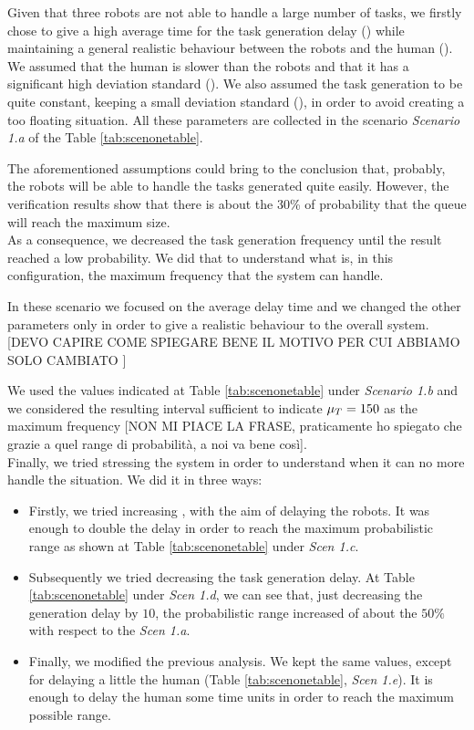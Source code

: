 Given that three robots are not able to handle a large number of tasks, we firstly chose to give a high average time for the task generation delay (\mT) while maintaining a general realistic behaviour between the robots and the human (\mH). We assumed that the human is slower than the robots and that it has a significant high deviation standard (\vH). We also assumed the task generation to be quite constant, keeping a small deviation standard (\vT), in order to avoid creating a too floating situation. All these parameters are collected in the scenario \emph{Scenario 1.a} of the Table \ref{tab:scenonetable}.

The aforementioned assumptions could bring to the conclusion that, probably, the robots will be able to handle the tasks generated quite easily. However, the verification results show that there is about the 30\% of probability that the queue will reach the maximum size.
\\

As a consequence, we decreased the task generation frequency until the result reached a low probability. We did that to understand what is, in this configuration, the maximum frequency that the system can handle.

In these scenario we focused on the average delay time \mT \space and we changed the other parameters only in order to give a realistic behaviour to the overall system. [DEVO CAPIRE COME SPIEGARE BENE IL MOTIVO PER CUI ABBIAMO SOLO CAMBIATO \mT]

We used the values indicated at Table \ref{tab:scenonetable} under \emph{Scenario 1.b} and we considered the resulting interval sufficient to indicate $\mu_T = 150$ as the maximum frequency [NON MI PIACE LA FRASE, praticamente ho spiegato che grazie a quel range di probabilità, a noi va bene così].
\\

Finally, we tried stressing the system in order to understand when it can no more handle the situation. We did it in three ways:
\begin{itemize}
    \item Firstly, we tried increasing \K, with the aim of delaying the robots. It was enough to double the delay in order to reach the maximum probabilistic range as shown at Table \ref{tab:scenonetable} under \emph{Scen 1.c}.
    \item Subsequently we tried decreasing the task generation delay. At Table \ref{tab:scenonetable} under \emph{Scen 1.d}, we can see that, just decreasing the generation delay by $10$, the probabilistic range increased of about the $50\%$ with respect to the \emph{Scen 1.a}.
    \item Finally, we modified the previous analysis. We kept the same values, except for delaying a little the human (Table \ref{tab:scenonetable}, \emph{Scen 1.e}). It is enough to delay the human some time units in order to reach the maximum possible range.
\end{itemize}

